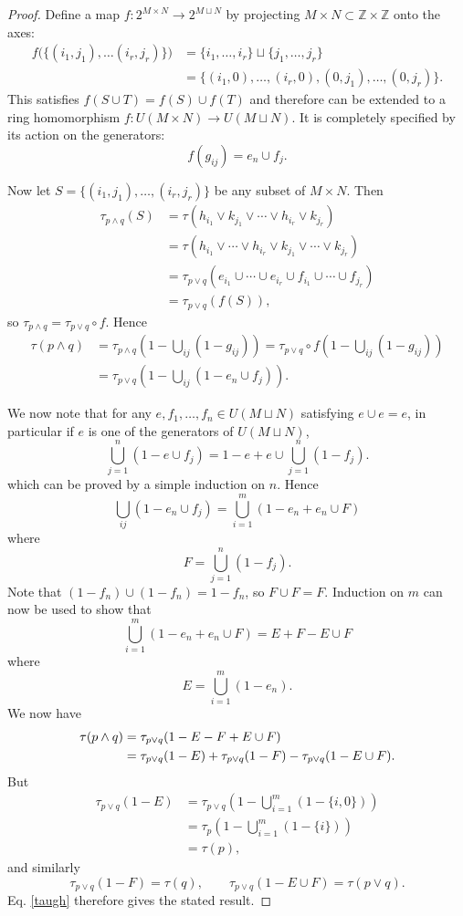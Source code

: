 \documentclass[12pt,a4paper,reqno]{article}
\newcommand{\upline}{\vspace{-1.2\abovedisplayskip}}
\renewcommand{\(}{\left(}
\renewcommand{\)}{\right)}
\newcommand{\Z}{\mathbb{Z}}
\newcommand{\<}{\langle}
\renewcommand{\>}{\rangle}
\newcommand{\be}{\begin{equation}}
\newcommand{\ee}{\end{equation}}
\theoremstyle{plain} %
\begin{document}
\begin{proof}
Define a map $f:2^{M\times N} \to 2^{M\sqcup N}$ by projecting $M\times N \subset \Z\times\Z$ onto the axes: 
\begin{align*}
f\big(\{(i_1,j_1),\ldots (i_r,j_r)\}\big) &= \{i_1,\ldots,i_r\}\sqcup\{j_1,\ldots,j_r\}\\
&=\{(i_1,0),\ldots,(i_r,0),(0,j_1),\ldots,(0,j_r)\}.
\end{align*}
This satisfies $f(S\cup T) = f(S)\cup f(T)$ and therefore can be extended to a ring homomorphism $f:U(M\times N) \to U(M\sqcup N)$. It is completely specified by its action on the generators: 
\be\label{gen}
f(g_{ij}) = e_n\cup f_j.
\ee

Now let $S = \{(i_1,j_1),\ldots ,(i_r,j_r)\}$ be any subset of $M\times N$. Then
\begin{align*}
\tau_{p\land q}(S)
&= \tau\(h_{i_1}\lor k_{j_1}\lor\cdots\lor h_{i_r}\lor k_{j_r}\)\\
&= \tau\(h_{i_1}\lor\cdots\lor h_{i_r}\lor k_{j_1}\lor\cdots \lor k_{j_r}\)\\
&= \tau_{p\lor q}\(e_{i_1}\cup\cdots\cup e_{i_r}\cup f_{i_1}\cup\cdots\cup f_{j_r}\)\\
&= \tau_{p\lor q}(f(S)),
\end{align*}
so $\tau_{p\land q} = \tau_{p\lor q}\circ f$. Hence
\begin{align*}
\tau(p\land q) &= \tau_{p\land q}\(1 - \bigcup_{ij}(1 - g_{ij})\)
= \tau_{p\lor q}\circ f\(1 - \bigcup_{ij}(1 - g_{ij})\)\\
&= \tau_{p\lor q}\(1 - \bigcup_{ij}\(1 - e_n\cup f_j\)\).
\end{align*}

We now note that for any $e, f_1,\ldots,f_n\in U(M\sqcup N)$ satisfying $e\cup e = e$, in particular if $e$ is one of the generators of $U(M\sqcup N)$,
\[
\bigcup_{j=1}^n (1 - e\cup f_j) = 1 - e + e\cup\bigcup_{j=1}^n(1 - f_j).
\]
which can be proved by a simple induction on $n$. Hence
\[
\bigcup_{ij}(1 - e_n\cup f_j) = \bigcup_{i=1}^m(1 - e_n + e_n\cup F)
\]
where
\upline
\[
F = \bigcup_{j=1}^n(1 - f_j).
\]
Note that $(1 - f_n)\cup(1 - f_n) = 1 - f_n$, so $F\cup F = F$. Induction on $m$ can now be used to show that 
\[
\bigcup_{i=1}^m(1 - e_n + e_n\cup F) = E + F - E\cup F
\]
where
\upline
\[
E = \bigcup_{i=1}^m (1- e_n).
\]
We now have
\begin{align}\label{taugh}
\tau(p\land q) &= \tau_{p\lor q} (1 - E - F + E\cup F)\notag\\
&= \tau_{p\lor q}(1 - E) + \tau_{p\lor q}(1 - F) - \tau_{p\lor q}(1 - E\cup F).
\end{align}
But
\upline
\begin{align*}
\tau_{p\lor q}(1 - E) &= \tau_{p\lor q}\(1 - \bigcup_{i=1}^m(1 - \{i,0\})\)\\
&= \tau_p\( 1 - \bigcup_{i=1}^m(1 - \{i\})\)\\
&= \tau(p),
\end{align*}
and similarly
\[
\tau_{p\lor q}(1 - F) = \tau(q), \qquad \tau_{p\lor q}(1 - E\cup F) = \tau(p\lor q).
\]
Eq. \eqref{taugh} therefore gives the stated result.
\end{proof}
\end{document}
